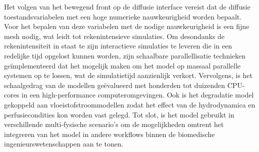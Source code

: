 Het volgen van het bewegend front op de diffusie interface vereist dat de diffusie toestandsvariabelen met een hoge numerieke nauwkeurigheid worden bepaalt. Voor het bepalen van deze variabelen met de nodige nauwkeurigheid is een fijne mesh nodig, wat leidt tot rekenintensieve simulaties. Om desondanks de rekenintensiteit in staat te zijn interactieve simulaties te leveren die in een redelijke tijd opgelost kunnen worden, zijn schaalbare parallellisatie technieken geïmplementeerd dat het mogelijk maken om het model op massaal parallelle systemen op te lossen, wat de simulatietijd aanzienlijk verkort. Vervolgens, is het schaalgedrag van de modellen geëvalueerd met honderden tot duizenden CPU-cores in een high-performance computeromgevingen. Ook is het degradatie model gekoppeld aan vloeistofstroommodellen zodat het effect van de hydrodynamica en perfusiecondities kon worden vast gelegd. Tot slot, is het model gebruikt in verschillende multi-fysische scenario's om de mogelijkheden omtrent het integreren van het model in andere workflows binnen de biomedische ingenieurswetenschappen aan te tonen.

\cleardoublepage

